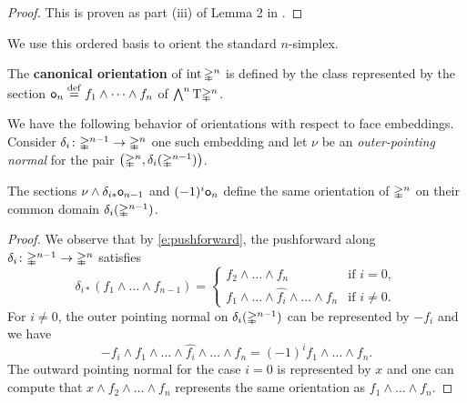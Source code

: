 \begin{proof}
	This is proven as part (iii) of Lemma 2 in \cite{halperin1972stiefel_whitney}.
\end{proof}

We use this ordered basis to orient the standard $n$-simplex.

\begin{definition}
	The \textbf{canonical orientation} of $\operatorname{int}\mathbb{\Delta}^n$ is defined by the class represented by the section $\mathsf{o}_n \stackrel{\mathrm{def}}{=} f_1 \wedge \dots \wedge f_n$ of $\bigwedge^n \mathrm{T} \mathbb{\Delta}^n$.
\end{definition}

We have the following behavior of orientations with respect to face embeddings.
Consider $\delta_i \colon \mathbb{\Delta}^{n-1} \to \mathbb{\Delta}^n$ one such embedding and let $\nu$ be an \emph{outer-pointing normal} for the pair $\big( \mathbb{\Delta}^n, \delta_i(\mathbb{\Delta}^{n-1}) \big)$.

\begin{lemma}
	The sections $\nu \wedge \mathsf \delta_{i\ast} \mathsf{o}_{n-1}$ and $(-1)^i \mathsf{o}_{n}$ define the same orientation of $\mathbb{\Delta}^n$ on their common domain $\delta_i(\mathbb{\Delta}^{n-1})$.
\end{lemma}

\begin{proof}
	We observe that by \cref{e:pushforward}, the pushforward along $\delta_i \colon \mathbb{\Delta}^{n-1} \to \mathbb{\Delta}^n$ satisfies
	\[
	\delta_{i \ast} (f_1 \wedge \dots \wedge f_{n-1}) =
	\begin{cases}
		f_2 \wedge \dots \wedge f_n &
		\text{if } i = 0, \\
		f_1 \wedge \dots \wedge \widehat{f_i} \wedge \dots \wedge f_n
		& \text{if } i \neq 0.
	\end{cases}
	\]
	For $i \neq 0$, the outer pointing normal on $\delta_i(\mathbb{\Delta}^{n-1})$ can be represented by $- f_i$ and we have
	\[
	-f_i \wedge f_1 \wedge \dots \wedge \widehat{f_i} \wedge \dots \wedge f_n =
	(-1)^i f_1 \wedge \dots \wedge f_n.
	\]
	The outward pointing normal for the case $i = 0$ is represented by $x$ and one can compute that
	$x \wedge f_2 \wedge \dots \wedge f_n$ represents the same orientation as $f_1 \wedge \dots \wedge f_n$.
\end{proof}
